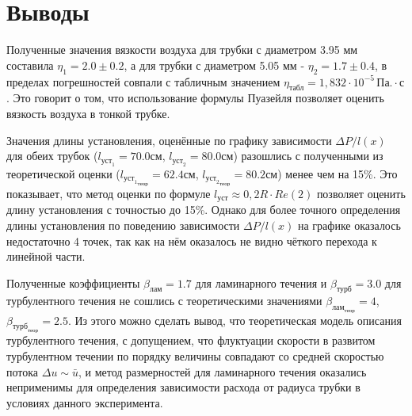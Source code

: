 \chapter{Выводы}
\label{ch:conclusions}

Полученные значения вязкости воздуха для трубки с диаметром 3.95 мм составила $\eta_1 = 2.0 \pm 0.2$, а для трубки с диаметром 5.05 мм - $\eta_2 = 1.7 \pm 0.4$, в пределах погрешностей совпали с табличным значением $\eta_{\text{табл}} =  1,832 \cdot 10^{-5} \, \text{Па}. \cdot \text{с}$. Это говорит о том, что использование формулы Пуазейля позволяет оценить вязкость воздуха в тонкой трубке. 

Значения длины установления, оценённые по графику зависимости $\Delta P/l(x)$ для обеих трубок ($l_{\text{уст}_1} = 70.0 \text{см}$, $l_{\text{уст}_2} = 80.0 \text{см}$) разошлись с полученными из теоретической оценки ($l_{{\text{уст}_1}_\text{теор}} = 62.4 \text{см}$, $l_{{\text{уст}_2}_\text{теор}} = 80.2 \text{см}$) менее чем на 15\%. Это показывает, что метод оценки по формуле  $l_\text{уст} \approx 0,2R \cdot Re (2)$ позволяет оценить длину установления с точностью до 15\%. Однако для более точного определения длины установления по поведению зависимости  $\Delta P/l(x)$ на графике оказалось недостаточно 4 точек, так как на нём оказалось не видно чёткого перехода к линейной части.

Полученные коэффициенты $\beta_\text{лам} = 1.7$ для ламинарного течения и $\beta_\text{турб} = 3.0$ для турбулентного течения не сошлись с теоретическими значениями $\beta_{\text{лам}_\text{теор}} = 4$,  $\beta_{\text{турб}_\text{теор}} = 2.5$. Из этого можно сделать вывод, что теоретическая модель описания турбулентного течения, с допущением, что флуктуации скорости в развитом турбулентном течении по порядку величины совпадают со средней скоростью потока $\Delta u \sim  \bar{u}$, и метод размерностей для ламинарного течения оказались неприменимы для определения зависимости расхода от радиуса трубки в условиях данного эксперимента.